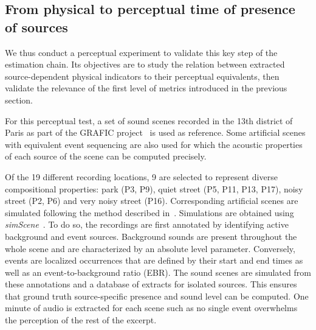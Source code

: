 \documentclass{article}
\begin{document}
\begin{sloppy}
\section{From physical to perceptual time of presence of sources}
\label{sec:val}

We thus conduct a perceptual experiment to validate this key step of the estimation chain. Its objectives are to study the relation between extracted source-dependent physical indicators to their perceptual equivalents, then validate the relevance of the first level of metrics introduced in the previous section.

For this perceptual test, a set of sound scenes recorded in the 13th district of Paris as part of the GRAFIC project~\cite{aumond2017} is used as reference. Some artificial scenes with equivalent event sequencing are also used for which the acoustic properties of each source of the scene can be computed precisely.

Of the 19 different recording locations, 9 are selected to represent diverse compositional properties: park (P3, P9), quiet street (P5, P11, P13, P17), noisy street (P2, P6) and very noisy street (P16). Corresponding artificial scenes are simulated following the method described in~\cite{gloaguen2017}. Simulations are obtained using \textit{simScene}~\cite{rossignol2015}. To do so, the recordings are first annotated by identifying active background and event sources. Background sounds are present throughout the whole scene and are characterized by an absolute level parameter. Conversely, events are localized occurrences that are defined by their start and end times as well as an event-to-background ratio (EBR). The sound scenes are simulated from these annotations and a database of extracts for isolated sources. This ensures that ground truth source-specific presence and sound level can be computed. One minute of audio is extracted for each scene such as no single event overwhelms the perception of the rest of the excerpt.


\end{sloppy}
\end{document}
